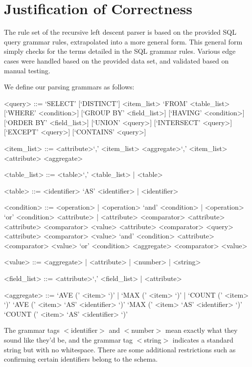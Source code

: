 \documentclass[]{article}
\begin{document}
	\section{Justification of Correctness}\label{grammars}
	
	The rule set of the recursive left descent parser is based on the provided SQL query grammar rules, extrapolated into a more general form. This general form simply checks for the terms detailed in the SQL grammar rules.  Various edge cases were handled based on the provided data set, and validated based on manual testing. 
		
	We define our parsing grammars as follows: \\
	
	\setlength{\grammarparsep}{20pt plus 1pt minus 1pt} %
	\setlength{\grammarindent}{12em} %
	
	\begin{grammar}
		
		<query> ::= `SELECT' [`DISTINCT'] <item\_list> `FROM' <table\_list> [`WHERE' <condition>] [`GROUP BY' <field\_list>] [`HAVING' <condition>] [`ORDER BY' <field\_list>] [`UNION' <query>] [`INTERSECT' <query>] [`EXCEPT' <query>] [`CONTAINS' <query>] 
		
		<item\_list> ::= <attribute>`,' <item\_list>
		\alt <aggregate>`,' <item\_list>
		\alt <attribute>
		\alt <aggregate>
		
		<table\_list> ::= <table>`,' <table\_list> | <table>
		
		<table> ::= <identifier> `AS' <identifier> | <identifier>
		
		<condition> ::= <operation> | <operation> `and' <condition> | <operation> `or' <condition>
		\alt <attribute> | <attribute> <comparator> <attribute>
		\alt <attribute> <comparator> <value>
		\alt <attribute> <comparator> <query>
		\alt <attribute> <comparator> <value> `and' <condition>
		\alt <attribute> <comparator> <value> `or' <condition>
		\alt <aggregate> <comparator> <value>
		
		<value> ::= <aggregate> | <attribute> | <number> | <string>
		
		<field\_list> ::= <attribute>`,' <field\_list> | <attribute>
		
		<aggregate> ::= `AVE (' <item> `)' | `MAX (' <item> `)' | `COUNT (' <item> `)'
		\alt `AVE (' <item> `AS' <identifier> `)'
		\alt `MAX (' <item> `AS' <identifier> `)'
		\alt `COUNT (' <item> `AS' <identifier> `)'
		
	\end{grammar}
	
	The grammar tags $<$identifier$>$ and $<$number$>$ mean exactly what they sound like they'd be, and the grammar tag $<$string$>$ indicates a standard string but with no whitespace. There are some additional restrictions such as confirming certain identifiers belong to the schema.
	
	
	
\end{document}
